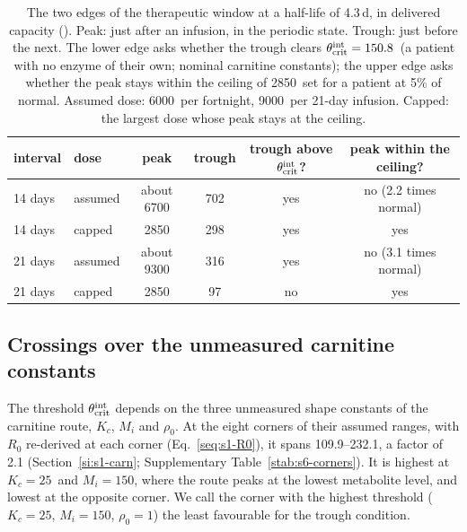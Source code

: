 \begin{table}[tbp]
\centering
\small
\caption{\label{stab:s6-rules}The two edges of the therapeutic window at a half-life of 4.3\,d,
in delivered capacity (\um). Peak: just after an infusion, in the periodic state. Trough: just
before the next. The lower edge asks whether the trough clears $\theta_{\mathrm{crit}}^{\mathrm{int}}=150.8$\um\ (a patient with
no enzyme of their own; nominal carnitine constants); the upper edge asks whether the peak stays
within the ceiling of 2850\um\ set for a patient at 5\% of normal. Assumed dose: 6000\um\ per
fortnight, 9000\um\ per 21-day infusion. Capped: the largest dose whose peak stays at the
ceiling.}
\begin{tabular}{@{}llcccc@{}}
\toprule
interval & dose & peak & trough & trough above $\theta_{\mathrm{crit}}^{\mathrm{int}}$? & peak within the ceiling? \\
\midrule
14 days & assumed & about 6700 & 702 & yes & no (2.2 times normal) \\
14 days & capped & 2850 & 298 & yes & yes \\
21 days & assumed & about 9300 & 316 & yes & no (3.1 times normal) \\
21 days & capped & 2850 & 97 & no & yes \\
\bottomrule
\end{tabular}
\end{table}

\subsection{Crossings over the unmeasured carnitine constants}
\label{si:s6:corners}

The threshold $\theta_{\mathrm{crit}}^{\mathrm{int}}$ depends on the three unmeasured shape constants of the carnitine route,
$K_c$, $M_i$ and $\rho_0$. At the eight corners of their assumed ranges, with $R_0$ re-derived at
each corner (Eq.~\eqref{seq:s1-R0}), it spans 109.9--232.1\um, a factor of 2.1
(Section~\ref{si:s1-carn}; Supplementary Table~\ref{stab:s6-corners}). It is highest at
$K_c=25$\uM\ and $M_i=150$\uM, where the route peaks at the lowest metabolite level, and lowest
at the opposite corner. We call the corner with the highest threshold ($K_c=25$\uM,
$M_i=150$\uM, $\rho_0=1$) the least favourable for the trough condition.

